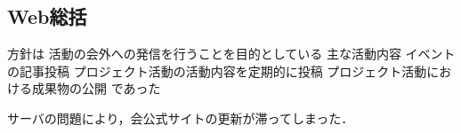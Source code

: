 \subsection*{Web総括}

方針は
    活動の会外への発信を行うことを目的としている
    主な活動内容
    イベントの記事投稿
    プロジェクト活動の活動内容を定期的に投稿
    プロジェクト活動における成果物の公開
であった

サーバの問題により，会公式サイトの更新が滞ってしまった．
